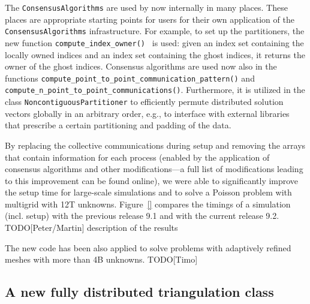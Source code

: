 \documentclass{ansarticle-preprint}
\begin{document}
The \texttt{ConsensusAlgorithms} are used by now internally in many places. These 
places are appropriate starting points for users for their own application of the 
\texttt{ConsensusAlgorithms} infrastructure.
For example, to set up the partitioners, the new function 
\texttt{compute\_index\_owner() } is used: given an index set containing the 
locally owned indices and an index set containing the ghost indices, it returns 
the owner of the ghost indices. Consensus algorithms are used now also in the 
functions \texttt{compute\_point\_to\_point\_communication\_pattern()} and 
\texttt{compute\_\allowbreak n\_\allowbreak point\_\allowbreak to\_\allowbreak point\_\allowbreak communications()}. 
Furthermore, it is utilized in the class \texttt{NoncontiguousPartitioner} to 
efficiently permute distributed solution vectors globally in an arbitrary order, e.g., 
to interface with external libraries that prescribe a certain partitioning and 
padding of the data.

By replacing the collective communications during setup and removing the arrays 
that contain information for each process (enabled by the application of consensus 
algorithms and other modifications---a full list of modifications leading to this 
improvement can be found online), we were able to significantly improve the setup 
time for large-scale simulations and to solve a Poisson problem with multigrid 
with 12T unknowns. 
Figure~\ref{} compares the timings of a simulation (incl. setup) with the 
previous release 9.1 and with the current release 9.2. 
{\color{red}TODO[Peter/Martin] description of the results}

The new code has been also applied to solve problems with adaptively refined 
meshes with more than 4B unknowns. {\color{red}TODO[Timo]}


\subsection{A new fully distributed triangulation class}
\label{subsec:pft}
\end{document}

